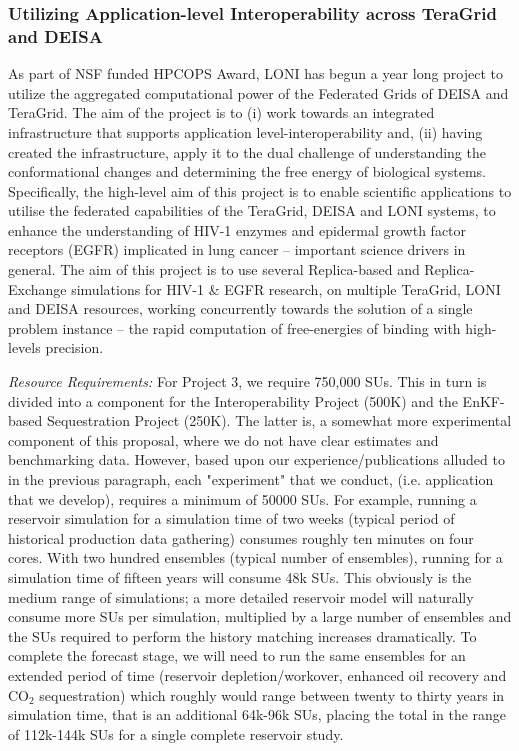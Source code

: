 \documentclass[a4paper,10pt]{article}
\begin{document}
\subsubsection*{Utilizing Application-level Interoperability across TeraGrid and DEISA}
As part of NSF funded HPCOPS Award, LONI has begun a year long project to utilize the aggregated computational power of the Federated Grids of DEISA and TeraGrid. The aim of the project is to (i) work towards an integrated infrastructure that supports application level-interoperability and, (ii) having created the infrastructure, apply it to the dual challenge of understanding the conformational changes and determining the free energy of biological systems. Specifically, the high-level aim of this project is to enable scientific applications to utilise the federated capabilities of the TeraGrid, DEISA and LONI systems, to enhance the understanding of HIV-1 enzymes and epidermal growth factor receptors (EGFR) implicated in lung cancer -- important science drivers in general. The aim of this project is to use several Replica-based and Replica-Exchange simulations for HIV-1 \& EGFR research, on multiple TeraGrid, LONI and DEISA resources, working concurrently towards the solution of a single problem instance -- the rapid computation of free-energies of binding with high-levels precision.

{\it Resource Requirements:} For Project 3, we require 750,000 SUs. This in turn is divided into a component for the Interoperability Project (500K) and the EnKF-based Sequestration Project (250K). The latter is, a somewhat more experimental component of this proposal, where we do not have clear estimates and benchmarking data. However, based upon our experience/publications alluded to in the previous paragraph, each "experiment" that we conduct, (i.e. application that we develop), requires a minimum of 50000 SUs. For example, running a reservoir simulation for a simulation time of two weeks (typical period of historical production data gathering) consumes roughly ten minutes on four cores.  With two hundred ensembles (typical number of ensembles), running for a simulation time of fifteen years will consume 48k SUs. This obviously is the medium range of simulations; a more detailed reservoir model will naturally consume more SUs per simulation, multiplied by a large number of ensembles and the SUs required to perform the history matching increases dramatically. To complete the forecast stage, we will need to run the same ensembles for an extended period of time (reservoir depletion/workover, enhanced oil recovery and CO$_2$ sequestration) which roughly would range between twenty to thirty years in simulation time, that is an additional 64k-96k SUs, placing the total in the range of 112k-144k SUs for a single complete reservoir study.
\end{document}

